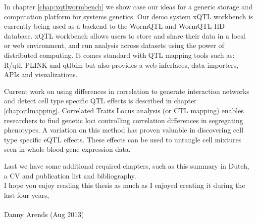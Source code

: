 \documentclass[8pt, twoside]{book}
\begin{document}
In chapter \ref{chap:xqtlwormbench} we show case our ideas for a generic storage and 
computation platform for systems genetics. Our demo system xQTL workbench is currently 
being used as a backend to the WormQTL and WormQTL-HD database. xQTL workbench allows 
users to store and share their data in a local or web environment, and run analysis across 
datasets using the power of distributed computing. It comes standard with QTL mapping 
tools such as: R/qtl, PLINK and qtlbim but also provides a web inferfaces, data importers, 
APIs and visualizations.

Current work on using differences in correlation to generate interaction networks and detect 
cell type specific QTL effects is described in chapter \ref{chap:ctlmapping}. Correlated 
Traits Locus analysis (or CTL mapping) enables researchers to find genetic loci controlling 
correlation differences in segregating phenotypes. A variation on this method has proven 
valuable in discovering cell type specific eQTL effects. These effects can be used to 
untangle cell mixtures seen in whole blood gene expression data.


Last we have some additional required chapters, such as this summary in Dutch, a CV and publication 
list and bibliography.\\

I hope you enjoy reading this thesis as much as I enjoyed creating it during the last four years,\\\\

Danny Arends (Aug 2013)
\newpage
\thispagestyle{empty}


















{\footnotesize

}
\end{document}
